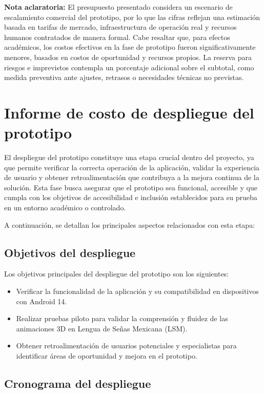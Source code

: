 \noindent \textbf{Nota aclaratoria:}  
El presupuesto presentado considera un escenario de escalamiento comercial del prototipo, por lo que las cifras reflejan una estimación basada en tarifas de mercado, infraestructura de operación real y recursos humanos contratados de manera formal. Cabe resaltar que, para efectos académicos, los costos efectivos en la fase de prototipo fueron significativamente menores, basados en costos de oportunidad y recursos propios. La reserva para riesgos e imprevistos contempla un porcentaje adicional sobre el subtotal, como medida preventiva ante ajustes, retrasos o necesidades técnicas no previstas.


\newpage

\section{Informe de costo de despliegue del prototipo}

El despliegue del prototipo constituye una etapa crucial dentro del proyecto, ya que permite verificar la correcta operación de la aplicación, validar la experiencia de usuario y obtener retroalimentación que contribuya a la mejora continua de la solución. Esta fase busca asegurar que el prototipo sea funcional, accesible y que cumpla con los objetivos de accesibilidad e inclusión establecidos para su prueba en un entorno académico o controlado.

A continuación, se detallan los principales aspectos relacionados con esta etapa:

\subsection{Objetivos del despliegue}

Los objetivos principales del despliegue del prototipo son los siguientes:

\begin{itemize}
	\item Verificar la funcionalidad de la aplicación y su compatibilidad en dispositivos con Android 14.
	\item Realizar pruebas piloto para validar la comprensión y fluidez de las animaciones 3D en Lengua de Señas Mexicana (LSM).
	\item Obtener retroalimentación de usuarios potenciales y especialistas para identificar áreas de oportunidad y mejora en el prototipo.
\end{itemize}

\subsection{Cronograma del despliegue}


